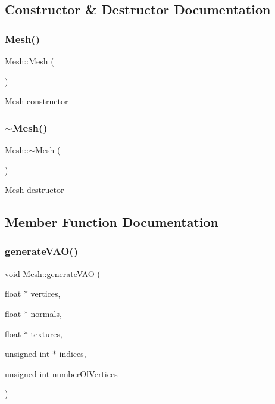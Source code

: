 \subsection{Constructor \& Destructor Documentation}
\mbox{\label{classMesh_a2af137f1571af89172b9c102302c416b}} 
\subsubsection{\texorpdfstring{Mesh()}{Mesh()}}
{\footnotesize\ttfamily Mesh\+::\+Mesh (\begin{DoxyParamCaption}{ }\end{DoxyParamCaption})}

\hyperlink{classMesh}{Mesh} constructor \mbox{\label{classMesh_a5efe4da1a4c0971cfb037bd70304c303}} 
\subsubsection{\texorpdfstring{$\sim$\+Mesh()}{~Mesh()}}
{\footnotesize\ttfamily Mesh\+::$\sim$\+Mesh (\begin{DoxyParamCaption}{ }\end{DoxyParamCaption})\hspace{0.3cm}{\ttfamily [virtual]}}

\hyperlink{classMesh}{Mesh} destructor 

\subsection{Member Function Documentation}
\mbox{\label{classMesh_a024b57bf1f509baa3d6aef3c530c74ee}} 
\subsubsection{\texorpdfstring{generate\+V\+A\+O()}{generateVAO()}}
{\footnotesize\ttfamily void Mesh\+::generate\+V\+AO (\begin{DoxyParamCaption}\item[{float $\ast$}]{vertices,  }\item[{float $\ast$}]{normals,  }\item[{float $\ast$}]{textures,  }\item[{unsigned int $\ast$}]{indices,  }\item[{unsigned int}]{number\+Of\+Vertices }\end{DoxyParamCaption})}

